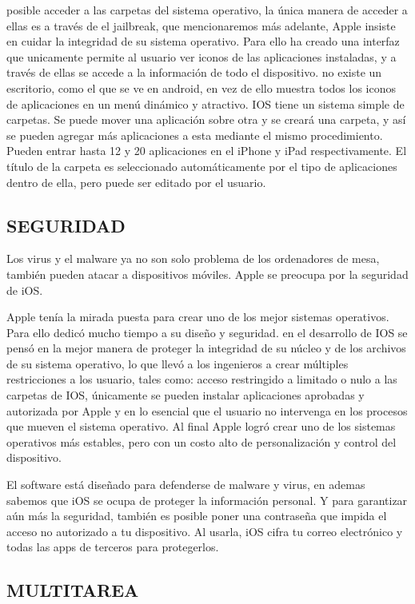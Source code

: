 posible acceder a las carpetas del sistema operativo, la única
manera de acceder a ellas es a través de el jailbreak, que
mencionaremos más adelante, Apple insiste en cuidar la
integridad de su sistema operativo. Para ello ha creado una
interfaz que unicamente permite al usuario ver iconos de las
aplicaciones instaladas, y a través de ellas se accede a la
información de todo el dispositivo. no existe un escritorio, como
el que se ve en android, en vez de ello muestra todos los iconos
de aplicaciones en un menú dinámico y atractivo.
IOS tiene un sistema simple de carpetas. Se puede mover una
aplicación sobre otra y se creará una carpeta, y así se pueden
agregar más aplicaciones a esta mediante el mismo
procedimiento. Pueden entrar hasta 12 y 20 aplicaciones en el
iPhone y iPad respectivamente. El título de la carpeta es
seleccionado automáticamente por el tipo de aplicaciones dentro
de ella, pero puede ser editado por el usuario.

\subsection*{SEGURIDAD}

Los virus y el malware ya no son solo problema de los
ordenadores de mesa, también pueden atacar a dispositivos
móviles. Apple se preocupa por la seguridad de iOS.

Apple tenía la mirada puesta para crear uno de los mejor
sistemas operativos. Para ello dedicó mucho tiempo a su diseño
y seguridad. en el desarrollo de IOS se pensó en la mejor
manera de proteger la integridad de su núcleo y de los archivos
de su sistema operativo, lo que llevó a los ingenieros a crear
múltiples restricciones a los usuario, tales como: acceso
restringido a limitado o nulo a las carpetas de IOS, únicamente
se pueden instalar aplicaciones aprobadas y autorizada por
Apple y en lo esencial que el usuario no intervenga en los
procesos que mueven el sistema operativo. Al final Apple logró
crear uno de los sistemas operativos más estables, pero con un
costo alto de personalización y control del dispositivo.

El software está diseñado para defenderse de malware y virus,
en ademas sabemos que iOS se ocupa de proteger la
información personal. Y para garantizar aún más la seguridad,
también es posible poner una contraseña que impida el acceso
no autorizado a tu dispositivo. Al usarla, iOS cifra tu correo
electrónico y todas las apps de terceros para protegerlos.


\subsection*{MULTITAREA}

